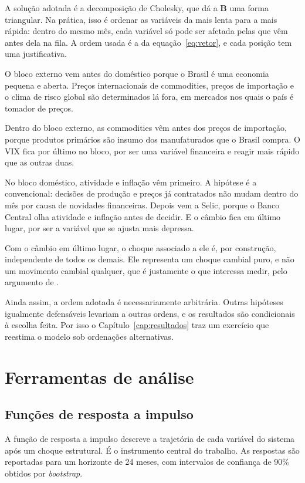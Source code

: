 \documentclass[12pt,openright,oneside,a4paper,portuguese,brazil]{abntex2}
\begin{document}
A solução adotada é a decomposição de Cholesky, que dá a $\mathbf{B}$ uma forma
triangular. Na prática, isso é ordenar as variáveis da mais lenta para a mais
rápida: dentro do mesmo mês, cada variável só pode ser afetada pelas que vêm
antes dela na fila. A ordem usada é a da equação~\eqref{eq:vetor}, e cada
posição tem uma justificativa.

O bloco externo vem antes do doméstico porque o Brasil é uma economia pequena e
aberta. Preços internacionais de commodities, preços de importação e o clima de
risco global são determinados lá fora, em mercados nos quais o país é tomador de
preços.

Dentro do bloco externo, as commodities vêm antes dos preços de importação,
porque produtos primários são insumo dos manufaturados que o Brasil compra. O
VIX fica por último no bloco, por ser uma variável financeira e reagir mais
rápido que as outras duas.

No bloco doméstico, atividade e inflação vêm primeiro. A hipótese é a
convencional: decisões de produção e preços já contratados não mudam dentro do
mês por causa de novidades financeiras. Depois vem a Selic, porque o Banco
Central olha atividade e inflação antes de decidir. E o câmbio fica em último
lugar, por ser a variável que se ajusta mais depressa.

Com o câmbio em último lugar, o choque associado a ele é, por construção,
independente de todos os demais. Ele representa um choque cambial puro, e não
um movimento cambial qualquer, que é justamente o que interessa medir, pelo
argumento de .

Ainda assim, a ordem adotada é necessariamente arbitrária. Outras hipóteses
igualmente defensáveis levariam a outras ordens, e os resultados são
condicionais à escolha feita. Por isso o
Capítulo~\ref{cap:resultados} traz um exercício que reestima o modelo sob
ordenações alternativas.

\section{Ferramentas de análise}
\label{sec:ferramentas}

\subsection{Funções de resposta a impulso}
\label{sec:fri}

A função de resposta a impulso descreve a trajetória de cada variável do
sistema após um choque estrutural. É o instrumento central do trabalho. As
respostas são reportadas para um horizonte de 24 meses, com intervalos de
confiança de 90\% obtidos por \textit{bootstrap}.
\end{document}
